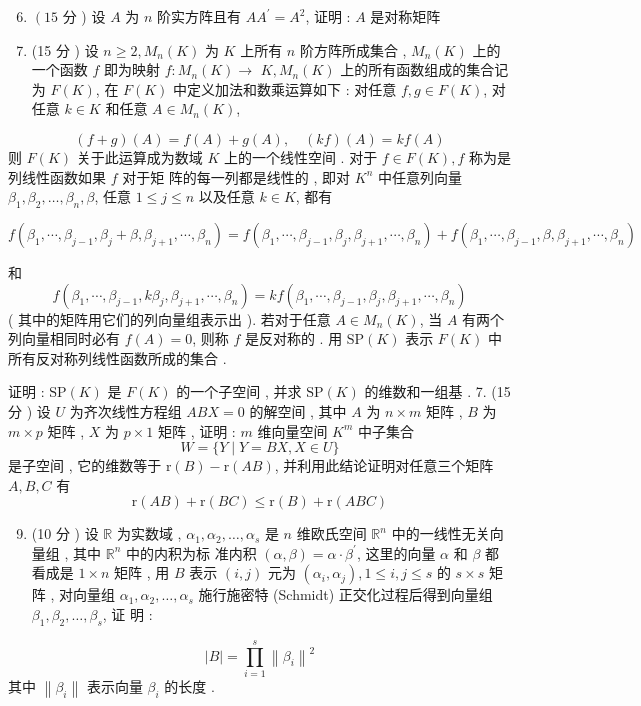 \documentclass[10pt]{article}
\begin{document}
\begin{enumerate}
  \setcounter{enumi}{5}
  \item $\left(15\right.$  分 )  设  $A$  为  $n$  阶实方阵且有  $A A^{\prime}=A^{2}$,  证明 : $A$  是对称矩阵 

  \item (15  分 )  设  $n \geqslant 2, M_{n}(K)$  为  $K$  上所有  $n$  阶方阵所成集合 , $M_{n}(K)$  上的一个函数  $f$  即为映射  $f: M_{n}(K) \rightarrow$ $K, M_{n}(K)$  上的所有函数组成的集合记为  $F(K)$,  在  $F(K)$  中定义加法和数乘运算如下 :  对任意  $f, g \in F(K)$,  对任意  $k \in K$  和任意  $A \in M_{n}(K)$,

\end{enumerate}
$$
(f+g)(A)=f(A)+g(A), \quad(k f)(A)=k f(A)
$$
 则  $F(K)$  关于此运算成为数域  $K$  上的一个线性空间 .  对于  $f \in F(K), f$  称为是列线性函数如果  $f$  对于矩   阵的每一列都是线性的 ,  即对  $K^{n}$  中任意列向量  $\beta_{1}, \beta_{2}, \ldots, \beta_{n}, \beta$,  任意  $1 \leqslant j \leqslant n$  以及任意  $k \in K$,  都有 

$f\left(\beta_{1}, \cdots, \beta_{j-1}, \beta_{j}+\beta, \beta_{j+1}, \cdots, \beta_{n}\right)=f\left(\beta_{1}, \cdots, \beta_{j-1}, \beta_{j}, \beta_{j+1}, \cdots, \beta_{n}\right)+f\left(\beta_{1}, \cdots, \beta_{j-1}, \beta, \beta_{j+1}, \cdots, \beta_{n}\right)$

 和 
$$
f\left(\beta_{1}, \cdots, \beta_{j-1}, k \beta_{j}, \beta_{j+1}, \cdots, \beta_{n}\right)=k f\left(\beta_{1}, \cdots, \beta_{j-1}, \beta_{j}, \beta_{j+1}, \cdots, \beta_{n}\right)
$$
( 其中的矩阵用它们的列向量组表示出 ).  若对于任意  $A \in M_{n}(K)$,  当  $A$  有两个列向量相同时必有  $f(A)=0$,  则称  $f$  是反对称的 .  用  $\mathrm{SP}(K)$  表示  $F(K)$  中所有反对称列线性函数所成的集合 .

 证明 : $\mathrm{SP}(K)$  是  $F(K)$  的一个子空间 ,  并求  $\mathrm{SP}(K)$  的维数和一组基 . 7. (15  分 )  设  $U$  为齐次线性方程组  $A B X=0$  的解空间 ,  其中  $A$  为  $n \times m$  矩阵 , $B$  为  $m \times p$  矩阵 , $X$  为  $p \times 1$  矩阵 ,  证明 : $m$  维向量空间  $K^{m}$  中子集合 
$$
W=\{Y \mid Y=B X, X \in U\}
$$
 是子空间 ,  它的维数等于  $\mathrm{r}(B)-\mathrm{r}(A B)$,  并利用此结论证明对任意三个矩阵  $A, B, C$  有 
$$
\mathrm{r}(A B)+\mathrm{r}(B C) \leqslant \mathrm{r}(B)+\mathrm{r}(A B C)
$$

\begin{enumerate}
  \setcounter{enumi}{8}
  \item (10  分 )  设  $\mathbb{R}$  为实数域 , $\alpha_{1}, \alpha_{2}, \ldots, \alpha_{s}$  是  $n$  维欧氏空间  $\mathbb{R}^{n}$  中的一线性无关向量组 ,  其中  $\mathbb{R}^{n}$  中的内积为标   准内积  $(\alpha, \beta)=\alpha \cdot \beta^{\prime}$,  这里的向量  $\alpha$  和  $\beta$  都看成是  $1 \times n$  矩阵 ,  用  $B$  表示  $(i, j)$  元为  $\left(\alpha_{i}, \alpha_{j}\right), 1 \leqslant i, j \leqslant s$  的  $s \times s$  矩阵 ,  对向量组  $\alpha_{1}, \alpha_{2}, \ldots, \alpha_{s}$  施行施密特  (Schmidt)  正交化过程后得到向量组  $\beta_{1}, \beta_{2}, \ldots, \beta_{s}$,  证   明 :
\end{enumerate}
$$
|B|=\prod_{i=1}^{s}\left\|\beta_{i}\right\|^{2}
$$
 其中  $\left\|\beta_{i}\right\|$  表示向量  $\beta_{i}$  的长度 .
\end{document}
